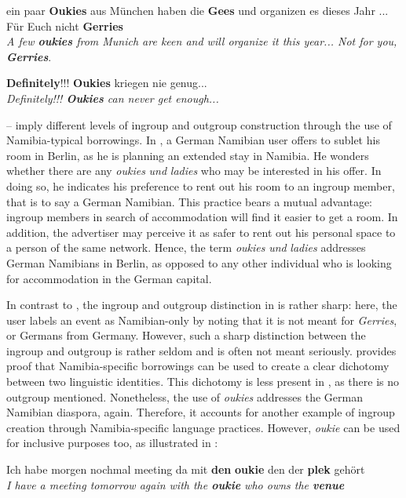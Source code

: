 \documentclass[output=paper]{langsci/langscibook}
\begin{document}
\ea\label{ex:radke:12}
ein paar \textbf{Oukies} aus München haben die \textbf{Gees} und organizen es dieses Jahr ... Für Euch nicht \textbf{Gerries}\\
\textit{A few \textbf{oukies} from Munich are keen and will organize it this year... Not for you, \textbf{Gerries}}.\\
\z

\ea\label{ex:radke:13}
 \textbf{Definitely}!!! \textbf{Oukies} kriegen nie genug...\\
\textit{{Definitely!!!} \textbf{{Oukies}} {can never get enough...}}\\
\z

-- imply different levels of ingroup and outgroup construction through the use of Namibia-typical borrowings. In , a German Namibian user offers to sublet his room in Berlin, as he is planning an extended stay in Namibia. He wonders whether there are any \textit{oukies} \textit{und} \textit{ladies} who may be interested in his offer. In doing so, he indicates his preference to rent out his room to an ingroup member, that is to say a German Namibian. This practice bears a mutual advantage:  ingroup members in search of accommodation will find it easier to get a room. In addition, the advertiser may perceive it as safer to rent out his personal space to a person of the same network. Hence, the term \textit{oukies} \textit{und} \textit{ladies} addresses German Namibians in Berlin, as opposed to any other individual who is looking for accommodation in the German capital.  

In contrast to , the ingroup and outgroup distinction in  is rather sharp: here, the user labels an event as Namibian-only by noting that it is not meant for \textit{Gerries}, or Germans from Germany. However, such a sharp distinction between the ingroup and outgroup is rather seldom and is often not meant seriously.  provides proof that Namibia-specific borrowings can be used to create a clear dichotomy between two linguistic identities. This dichotomy is less present in , as there is no outgroup mentioned. Nonetheless, the use of \textit{oukies} addresses the German Namibian diaspora, again. Therefore, it accounts for another example of ingroup creation through Namibia-specific language practices. However, \textit{oukie} can be used for inclusive purposes too, as illustrated in :

\ea\label{ex:radke:14}
 Ich habe morgen nochmal meeting da mit \textbf{den} \textbf{oukie} den der \textbf{plek} gehört\\
\textit{I have a meeting tomorrow again with the \textbf{oukie} who owns the \textbf{venue}}\\
\z
\end{document}
